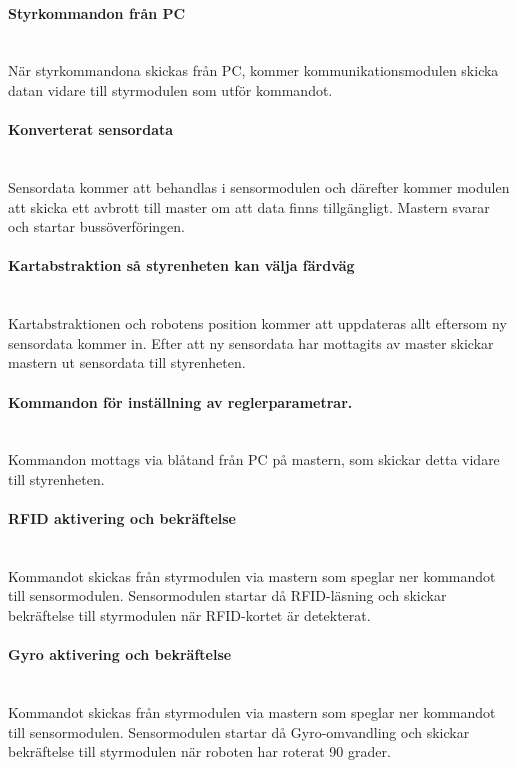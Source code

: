 \documentclass[a4paper,12pt,fleqn]{article}
\begin{document}
\paragraph{Styrkommandon från PC}
~\\
När styrkommandona skickas från PC, kommer kommunikationsmodulen skicka datan vidare till styrmodulen som utför kommandot.
\paragraph{Konverterat sensordata}
~\\
Sensordata kommer att behandlas i sensormodulen och därefter kommer modulen att skicka ett avbrott till master om att data finns tillgängligt. Mastern svarar och startar bussöverföringen.
\paragraph{Kartabstraktion så styrenheten kan välja färdväg}
~\\
Kartabstraktionen och robotens position kommer att uppdateras allt eftersom ny sensordata kommer in. Efter att ny sensordata har mottagits av master skickar mastern ut sensordata till styrenheten.
\paragraph{Kommandon för inställning av reglerparametrar.}
~\\
Kommandon mottags via blåtand från PC på mastern, som skickar detta vidare till styrenheten. 
\paragraph{RFID aktivering och bekräftelse}
~\\
Kommandot skickas från styrmodulen via mastern som speglar ner kommandot till sensormodulen. Sensormodulen startar då RFID-läsning och skickar bekräftelse till styrmodulen när RFID-kortet är detekterat.  

\paragraph{Gyro aktivering och bekräftelse}
~\\
Kommandot skickas från styrmodulen via mastern som speglar ner kommandot till sensormodulen. Sensormodulen startar då Gyro-omvandling och skickar bekräftelse till styrmodulen när roboten har roterat 90 grader. 
\end{document}
